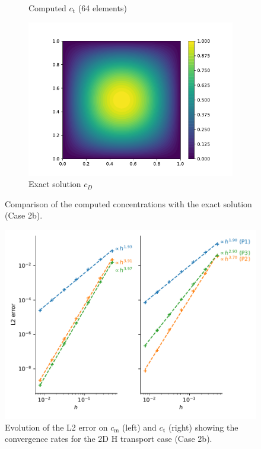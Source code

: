 \begin{figure}
\begin{subfigure}{0.3\linewidth}
        \caption{Computed $c_\mathrm{t}$ (64 elements)}
    \end{subfigure}%
    \begin{subfigure}{0.3\linewidth}
        \centering
        \includegraphics[width=\linewidth]{Figures/Chapter2/c_exact.pdf}
        \caption{Exact solution $c_D$}
    \end{subfigure}
    \caption{Comparison of the computed concentrations with the exact solution (Case 2b).}
    \label{fig: results MMS 2D H transport}
\end{figure}

\begin{figure}
    \centering
    \includegraphics[width=\linewidth]{Figures/Chapter2/convergence_rate_H.pdf}
    \caption{Evolution of the L2 error on $c_\mathrm{m}$ (left) and $c_\mathrm{t}$ (right) showing the convergence rates for the 2D H transport case (Case 2b).}
    \label{fig: convergence rates H}
\end{figure}
